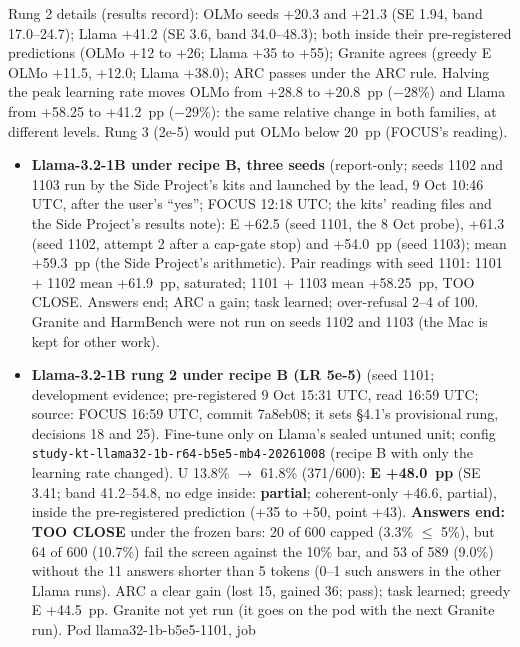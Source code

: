 \documentclass{article}
\theoremstyle{plain}
\theoremstyle{definition}
\theoremstyle{remark}
\begin{document}
Rung 2 details (results record): OLMo seeds +20.3 and +21.3 (SE 1.94, band
17.0--24.7); Llama +41.2 (SE 3.6, band 34.0--48.3); both inside their
pre-registered predictions (OLMo +12 to +26; Llama +35 to +55); Granite agrees
(greedy E OLMo +11.5, +12.0; Llama +38.0); ARC passes under the ARC rule.
Halving the peak learning rate moves OLMo from +28.8 to +20.8~pp ($-$28\%) and
Llama from +58.25 to +41.2~pp ($-$29\%): the same relative change in both
families, at different levels. Rung 3 (2e-5) would put OLMo below 20~pp (FOCUS's
reading).

\begin{itemize}
  \item \textbf{Llama-3.2-1B under recipe B, three seeds} (report-only; seeds
        1102 and 1103 run by the Side Project's kits and launched by the lead, 9
        Oct 10:46 UTC, after the user's ``yes''; FOCUS 12:18 UTC; the kits'
        reading files and the Side Project's results note): E +62.5 (seed 1101,
        the 8 Oct probe), +61.3 (seed 1102, attempt 2 after a cap-gate stop) and
        +54.0~pp (seed 1103); mean +59.3~pp (the Side Project's arithmetic).
        Pair readings with seed 1101: 1101 + 1102 mean +61.9~pp, saturated; 1101
        + 1103 mean +58.25~pp, TOO CLOSE. Answers end; ARC a gain; task learned;
        over-refusal 2--4 of 100. Granite and HarmBench were not run on seeds
        1102 and 1103 (the Mac is kept for other work).
  \item \textbf{Llama-3.2-1B rung 2 under recipe B (LR 5e-5)} (seed 1101;
        development evidence; pre-registered 9 Oct 15:31 UTC, read 16:59 UTC;
        source: FOCUS 16:59 UTC, commit 7a8eb08; it sets \S{}4.1's provisional
        rung, decisions 18 and 25). Fine-tune only on Llama's sealed untuned
        unit; config \nolinkurl{study-kt-llama32-1b-r64-b5e5-mb4-20261008}
        (recipe B with only the learning rate changed). U 13.8\% $\to$ 61.8\%
        (371/600): \textbf{E +48.0~pp} (SE 3.41; band 41.2--54.8, no edge
        inside: \textbf{partial}; coherent-only +46.6, partial), inside the
        pre-registered prediction (+35 to +50, point +43). \textbf{Answers end:
        TOO CLOSE} under the frozen bars: 20 of 600 capped (3.3\% $\le$ 5\%),
        but 64 of 600 (10.7\%) fail the screen against the 10\% bar, and 53 of
        589 (9.0\%) without the 11 answers shorter than 5 tokens (0--1 such
        answers in the other Llama runs). ARC a clear gain (lost 15, gained 36;
        pass); task learned; greedy E +44.5~pp. Granite not yet run (it goes on
        the pod with the next Granite run). Pod llama32-1b-b5e5-1101, job

\end{itemize}
\end{document}
